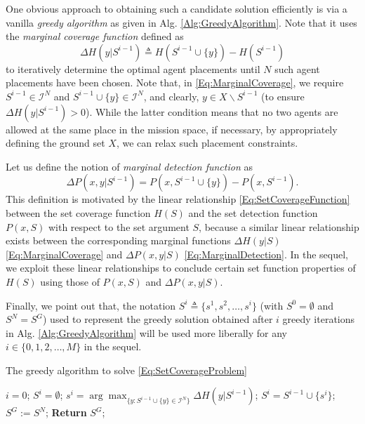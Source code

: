 \documentclass[letterpaper, 10 pt, conference]{ieeeconf}
\begin{document}
One obvious approach to obtaining such a candidate solution efficiently is via a vanilla \emph{greedy algorithm} as given in Alg. \ref{Alg:GreedyAlgorithm}. Note that it uses the \emph{marginal coverage function} defined as
\begin{equation}\label{Eq:MarginalCoverage}
    \Delta H(y \vert S^{i-1}) \triangleq H(S^{i-1}\cup\{y\}) - H(S^{i-1})
\end{equation}
to iteratively determine the optimal agent placements until $N$ such agent placements have been chosen. Note that, in \eqref{Eq:MarginalCoverage}, we require $S^{i-1}\in\mathcal{I}^N$ and $S^{i-1}\cup\{y\} \in\mathcal{I}^N$, and clearly, $y \in X \backslash S^{i-1}$ (to ensure $\Delta H(y \vert S^{i-1})>0$). While the latter condition means that no two agents are allowed at the same place in the mission space, if necessary, by appropriately defining the ground set $X$, we can relax such placement constraints. 

Let us define the notion of \emph{marginal detection function} as
\begin{equation}\label{Eq:MarginalDetection}
    \Delta P(x, y \vert S^{i-1}) = P(x, S^{i-1}\cup\{y\}) - P(x, S^{i-1}).
\end{equation}
This definition is motivated by the linear relationship \eqref{Eq:SetCoverageFunction} between the set coverage function $H(S)$ and the set detection function $P(x,S)$ with respect to the set argument $S$, because a similar linear relationship exists between the corresponding marginal functions $\Delta H(y \vert S)$ \eqref{Eq:MarginalCoverage} and $\Delta P(x,y\vert S)$ \eqref{Eq:MarginalDetection}. In the sequel, we exploit these linear relationships to conclude certain set function properties of $H(S)$ using those of $P(x,S)$ and $\Delta P(x,y\vert S)$.

Finally, we point out that, the notation $S^i \triangleq \{s^1,s^2,\ldots,s^i\}$ (with $S^0=\emptyset$ and $S^N=S^G$) used to represent the greedy solution obtained after $i$ greedy iterations in Alg. \ref{Alg:GreedyAlgorithm} will be used more liberally for any $i\in\{0,1,2,\ldots,M\}$ in the sequel. 



\begin{algorithm}[!h]
\caption{The greedy algorithm to solve \eqref{Eq:SetCoverageProblem}}\label{Alg:GreedyAlgorithm}
\begin{algorithmic}[1]
\State $i=0$; $S^i = \emptyset$;  
    \State $s^{i} = \arg \max_{\{y:S^{i-1} \cup \{y\} \in \mathcal{I}^N\}} \Delta H(y \vert S^{i-1})$; 
    \State $S^{i} = S^{i-1} \cup \{s^{i}\}$; 
\EndFor
\State $S^G := S^N$;  \textbf{Return} $S^G$;
\end{algorithmic}
\end{algorithm}
\end{document}
